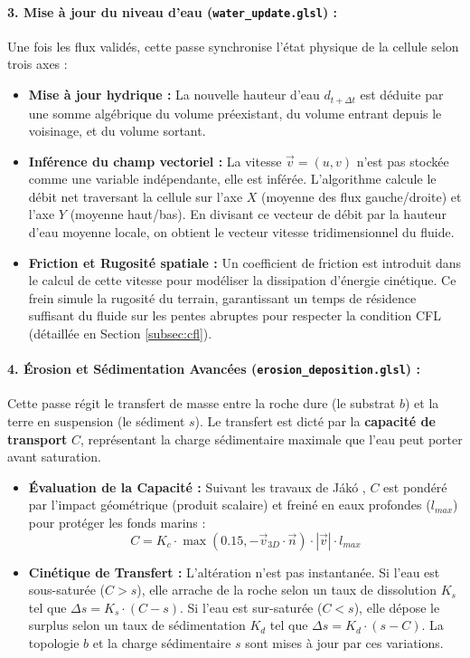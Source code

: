 \documentclass[10pt,twocolumn,a4paper]{article}
\begin{document}
\paragraph{3. Mise à jour du niveau d'eau (\texttt{water\_update.glsl}) :}
Une fois les flux validés, cette passe synchronise l'état physique de la cellule selon trois axes :
\begin{itemize}
    \item \textbf{Mise à jour hydrique :} La nouvelle hauteur d'eau $d_{t+\Delta t}$ est déduite par une somme algébrique du volume préexistant, du volume entrant depuis le voisinage, et du volume sortant.
    \item \textbf{Inférence du champ vectoriel :} La vitesse $\vec{v} = (u,v)$ n'est pas stockée comme une variable indépendante, elle est inférée. L'algorithme calcule le débit net traversant la cellule sur l'axe $X$ (moyenne des flux gauche/droite) et l'axe $Y$ (moyenne haut/bas). En divisant ce vecteur de débit par la hauteur d'eau moyenne locale, on obtient le vecteur vitesse tridimensionnel du fluide.
    \item \textbf{Friction et Rugosité spatiale :} Un coefficient de friction est introduit dans le calcul de cette vitesse pour modéliser la dissipation d'énergie cinétique. Ce frein simule la rugosité du terrain, garantissant un temps de résidence suffisant du fluide sur les pentes abruptes pour respecter la condition CFL (détaillée en Section \ref{subsec:cfl}).
\end{itemize}

\paragraph{4. Érosion et Sédimentation Avancées (\texttt{erosion\_deposition.glsl}) :}
Cette passe régit le transfert de masse entre la roche dure (le substrat $b$) et la terre en suspension (le sédiment $s$). Le transfert est dicté par la \textbf{capacité de transport} $C$, représentant la charge sédimentaire maximale que l'eau peut porter avant saturation.
\begin{itemize}
    \item \textbf{Évaluation de la Capacité :} Suivant les travaux de Jákó \cite{Jako11}, $C$ est pondéré par l'impact géométrique (produit scalaire) et freiné en eaux profondes ($l_{max}$) pour protéger les fonds marins :
          $$C = K_c \cdot \max(0.15, -\vec{v}_{3D} \cdot \vec{n}) \cdot |\vec{v}| \cdot l_{max}$$
    \item \textbf{Cinétique de Transfert :} L'altération n'est pas instantanée. Si l'eau est sous-saturée ($C > s$), elle arrache de la roche selon un taux de dissolution $K_s$ tel que $\Delta s = K_s \cdot (C - s)$. Si l'eau est sur-saturée ($C < s$), elle dépose le surplus selon un taux de sédimentation $K_d$ tel que $\Delta s = K_d \cdot (s - C)$. La topologie $b$ et la charge sédimentaire $s$ sont mises à jour par ces variations.
\end{itemize}
\end{document}
